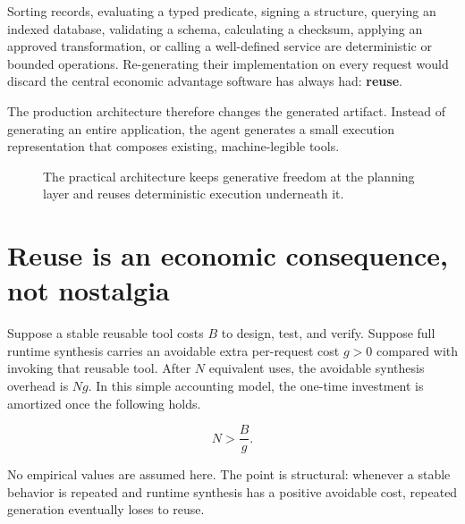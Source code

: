 \documentclass[10pt,oneside,openany]{book}
\begin{document}
Sorting records, evaluating a typed predicate, signing a structure, querying an indexed database, validating a schema, calculating a checksum, applying an approved transformation, or calling a well-defined service are deterministic or bounded operations. Re-generating their implementation on every request would discard the central economic advantage software has always had: \textbf{reuse}.

The production architecture therefore changes the generated artifact. Instead of generating an entire application, the agent generates a small execution representation that composes existing, machine-legible tools.

\begin{figure}[ht]
\centering
{}
\caption{The practical architecture keeps generative freedom at the planning layer and reuses deterministic execution underneath it.}
\end{figure}

\section{Reuse is an economic consequence, not nostalgia}

Suppose a stable reusable tool costs $B$ to design, test, and verify. Suppose full runtime synthesis carries an avoidable extra per-request cost $g>0$ compared with invoking that reusable tool. After $N$ equivalent uses, the avoidable synthesis overhead is $Ng$. In this simple accounting model, the one-time investment is amortized once the following holds.
\begin{formulabox}
\[
N > \frac{B}{g}.
\]
\end{formulabox}
No empirical values are assumed here. The point is structural: whenever a stable behavior is repeated and runtime synthesis has a positive avoidable cost, repeated generation eventually loses to reuse.
\end{document}
